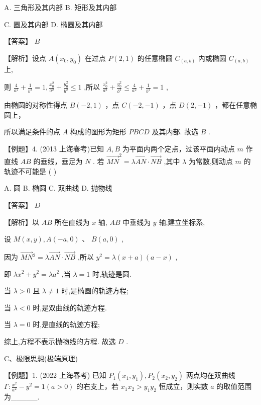 \documentclass[10pt]{article}
\begin{document}
A. 三角形及其内部 B. 矩形及其内部

C. 圆及其内部 D. 椭圆及其内部

【答案】 \(B\)

【解析】设点 \(A\left( {{x}_{0},{y}_{0}}\right)\) 在过点 \(P\left( {2,1}\right)\) 的任意椭圆 \({C}_{\left( a,b\right) }\) 内或椭圆 \({C}_{\left( a,b\right) }\) 上,

则 \(\frac{4}{{a}^{2}} + \frac{1}{{b}^{2}} = 1,\frac{{x}_{0}^{2}}{{a}^{2}} + \frac{{y}_{0}^{2}}{{b}^{2}} \leq  1\) ,所以 \(\frac{{x}_{0}^{2}}{{a}^{2}} + \frac{{y}_{0}^{2}}{{b}^{2}} \leq  \frac{4}{{a}^{2}} + \frac{1}{{b}^{2}} = 1\) ,

由椭圆的对称性得点 \(B\left( {-2,1}\right)\) ，点 \(C\left( {-2, - 1}\right)\) ，点 \(D\left( {2, - 1}\right)\) ，都在任意椭圆上，

所以满足条件的点 \(A\) 构成的图形为矩形 \({PBCD}\) 及其内部. 故选 \(B\) .

【例题】4. (2013 上海春考)已知 \(A,B\) 为平面内两个定点，过该平面内动点 \(m\) 作直线 \({AB}\) 的垂线，垂足为 \(N\) . 若 \({\overrightarrow{MN}}^{2} = \lambda \overrightarrow{AN} \cdot  \overrightarrow{NB}\) ,其中 \(\lambda\) 为常数,则动点 \(m\) 的轨迹不可能是 ( )

A. 圆 B. 椭圆 C. 双曲线 D. 抛物线

【答案】 \(D\)

【解析】以 \({AB}\) 所在直线为 \(x\) 轴, \({AB}\) 中垂线为 \(y\) 轴,建立坐标系,

设 \(M\left( {x,y}\right) ,A\left( {-a,0}\right) \text{ 、 }B\left( {a,0}\right)\) ,

因为 \(\overrightarrow{MN}{}^{2} = \lambda \overrightarrow{AN} \cdot  \overrightarrow{NB}\) ,所以 \({y}^{2} = \lambda \left( {x + a}\right) \left( {a - x}\right)\) ,

即 \(\lambda {x}^{2} + {y}^{2} = \lambda {a}^{2}\) ,当 \(\lambda  = 1\) 时,轨迹是圆.

当 \(\lambda  > 0\) 且 \(\lambda  \neq  1\) 时,是椭圆的轨迹方程;

当 \(\lambda  < 0\) 时,是双曲线的轨迹方程.

当 \(\lambda  = 0\) 时,是直线的轨迹方程;

综上,方程不表示抛物线的方程. 故选 \(D\) .

C、极限思想(极端原理)

【例题】1. (2022 上海春考) 已知 \({P}_{1}\left( {{x}_{1},{y}_{1}}\right) ,{P}_{2}\left( {{x}_{2},{y}_{2}}\right)\) 两点均在双曲线 \(\Gamma  : \frac{{x}^{2}}{{a}^{2}} - {y}^{2} = 1\left( {a > 0}\right)\) 的右支上，若 \({x}_{1}{x}_{2} > {y}_{1}{y}_{2}\) 恒成立，则实数 \(a\) 的取值范围为\_\_\_\_\_.
\end{document}
